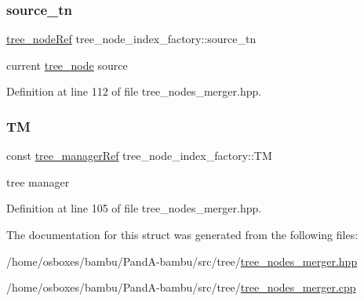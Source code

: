 \subsubsection{\texorpdfstring{source\+\_\+tn}{source\_tn}}
{\footnotesize\ttfamily \hyperlink{tree__node_8hpp_a6ee377554d1c4871ad66a337eaa67fd5}{tree\+\_\+node\+Ref} tree\+\_\+node\+\_\+index\+\_\+factory\+::source\+\_\+tn\hspace{0.3cm}{\ttfamily [private]}}



current \hyperlink{classtree__node}{tree\+\_\+node} source 



Definition at line 112 of file tree\+\_\+nodes\+\_\+merger.\+hpp.

\mbox{\label{structtree__node__index__factory_ab319ce8e22c4b63339fe9a0cc13949ed}} 
\subsubsection{\texorpdfstring{TM}{TM}}
{\footnotesize\ttfamily const \hyperlink{tree__manager_8hpp_a96ff150c071ce11a9a7a1e40590f205e}{tree\+\_\+manager\+Ref} tree\+\_\+node\+\_\+index\+\_\+factory\+::\+TM\hspace{0.3cm}{\ttfamily [private]}}



tree manager 



Definition at line 105 of file tree\+\_\+nodes\+\_\+merger.\+hpp.



The documentation for this struct was generated from the following files\+:\begin{DoxyCompactItemize}
\item 
/home/osboxes/bambu/\+Pand\+A-\/bambu/src/tree/\hyperlink{tree__nodes__merger_8hpp}{tree\+\_\+nodes\+\_\+merger.\+hpp}\item 
/home/osboxes/bambu/\+Pand\+A-\/bambu/src/tree/\hyperlink{tree__nodes__merger_8cpp}{tree\+\_\+nodes\+\_\+merger.\+cpp}\end{DoxyCompactItemize}
